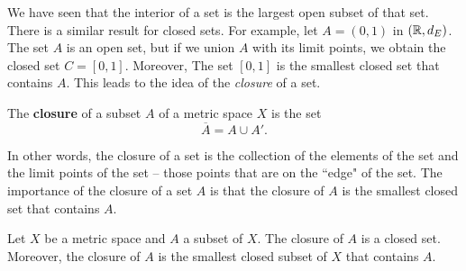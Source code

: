 \begin{comment}

\ActivitySolution

\ba
\item We need to show that $X \setminus C$ is open. 

\item To proceed by contradiction, we assume that $X \setminus C$ is not open.  

\item  Then there exists $x \in X \setminus C$ such that no neighborhood of $x$ is entirely contained in $X \setminus C$. 

\item This implies that every neighborhood of $x$ contains a point in $C$ and so $x$ is a limit point of $C$. It follows that $x \in C$, contradicting the fact that $x \in X \setminus C$. We conclude that $X \setminus C$ is open and $C$ is closed.

\ea

\end{comment}

\label{sec_set_closure}

We have seen that the interior of a set is the largest open subset of that set. There is a similar result for closed sets. For example, let $A = (0,1)$ in $(\mathbb{R}, d_E)$. The set $A$ is an open set, but if we union $A$ with its limit points, we obtain the closed set $C = [0,1]$. Moreover, The set $[0,1]$ is the smallest closed set that contains $A$. This leads to the idea of the \emph{closure} of a set. 

\begin{definition} The \textbf{closure} of a subset $A$ of a metric space $X$ is the set 
\[\overline{A} = A \cup A'.\]
\end{definition}

In other words, the closure of a set is the collection of the elements of the set and the limit points of the set -- those points that are on the ``edge" of the set. The importance of the closure of a set $A$ is that the closure of $A$ is the smallest closed set that contains $A$. 

\begin{theorem} \label{thm:closure_closed} Let $X$ be a metric space and $A$ a subset of $X$. The closure of $A$ is a closed set. Moreover, the closure of $A$ is the smallest closed subset of $X$ that contains $A$. 
\end{theorem}

